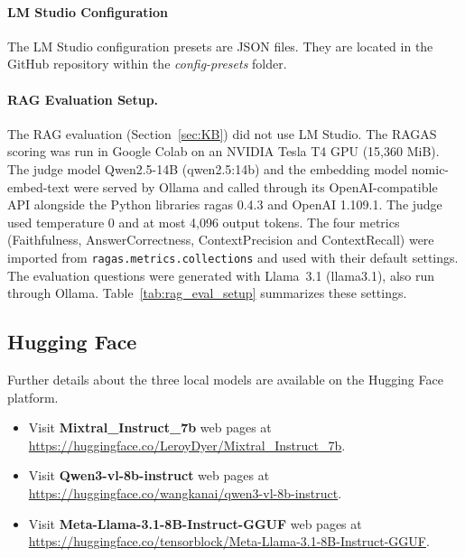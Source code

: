 \documentclass[bdcc,article,submit,pdftex,moreauthors]{Definitions/mdpi}
\begin{document}
\paragraph{LM Studio Configuration} The LM Studio configuration presets are JSON files. They are located in the GitHub repository within the \textit{config-presets} folder.

\paragraph{RAG Evaluation Setup.} The RAG evaluation (Section~\ref{sec:KB}) did not use LM Studio. The RAGAS scoring was run in Google Colab on an NVIDIA Tesla T4 GPU (15,360 MiB). 
The judge model Qwen2.5-14B (qwen2.5:14b) and the embedding model nomic-embed-text were served by Ollama and called through its OpenAI-compatible API alongside  the Python libraries ragas 0.4.3 and OpenAI 1.109.1. 
The judge used temperature 0 and at most 4,096 output tokens. 
The four metrics (Faithfulness, AnswerCorrectness, ContextPrecision and ContextRecall) were imported from \texttt{ragas.metrics.collections} and used with their default settings. The evaluation questions were generated with Llama~3.1 (llama3.1), also run through Ollama. Table~\ref{tab:rag_eval_setup} summarizes these settings.

\subsection[\appendixname~\thesubsection]{Hugging Face}
\label{app:sub_hf}
Further details about the three local models are available on the Hugging Face platform.

\begin{itemize}
\item Visit \textbf{Mixtral\_Instruct\_7b} web pages at {\scriptsize \url{https://huggingface.co/LeroyDyer/Mixtral_Instruct_7b}}.
\item Visit \textbf{Qwen3-vl-8b-instruct} web pages at {\scriptsize \url{https://huggingface.co/wangkanai/qwen3-vl-8b-instruct}}.
\item Visit \textbf{Meta-Llama-3.1-8B-Instruct-GGUF} web pages at {\scriptsize \url{ https://huggingface.co/tensorblock/Meta-Llama-3.1-8B-Instruct-GGUF}}.
\end{itemize}
\end{document}
